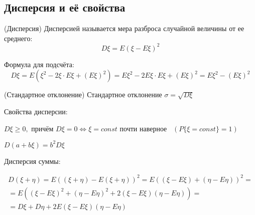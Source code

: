 \begin{multicols}{2}
    \subsection*{Дисперсия и её свойства}
    \begin{definition}{(Дисперсия)}{}
    Дисперсией называется мера разброса случайной величины от ее среднего:
    \[
        D\xi = E(\xi-E\xi)^2
    \]
    \end{definition}
    Формула для подсчёта:
    \[
        D\xi = E(\xi^2 - 2\xi \cdot E\xi + (E\xi)^2) = E\xi^2 - 2E\xi \cdot E\xi + (E\xi)^2 = E\xi^2 - (E\xi)^2
    \]
    \begin{definition}{(Стандартное отклонение)}{}
            Стандартное отклонение $\sigma = \sqrt{D\xi}$
    \end{definition}
    Свойства дисперсии:
    \begin{enumerate*}
        \item $D\xi \geq 0,$ причём $D\xi = 0 \iff \xi = const$ почти наверное \ $(P\{\xi = const\} = 1)$
        \item $D(a+b\xi) = b^2D\xi$
        \item Дисперсия суммы: 
    \end{enumerate*}
    \[
        \begin{array}{c}
            D(\xi + \eta) = E\left(\left(\xi + \eta\right) - E\left(\xi + \eta\right)\right)^2 = E\left(\left(\xi - E\xi\right) +\left(\eta - E\eta\right)\right)^2 = \\ = E\left(\left(\xi - E\xi\right)^2 + \left(\eta - E\eta\right)^2 + 2\left(\xi - E\xi\right)\left(\eta - E\eta\right)\right) = \\ = D\xi + D\eta + 2E(\xi - E\xi)(\eta - E\eta)
        \end{array}
        \]

\end{multicols}
